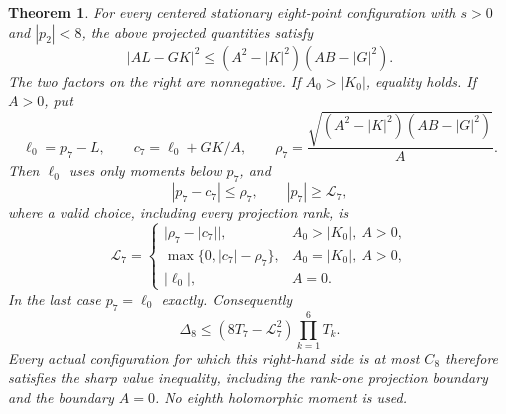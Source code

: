 \documentclass[11pt]{article}
\newtheorem{theorem}{Theorem}[section]
\theoremstyle{remark}
\numberwithin{equation}{section}
\begin{document}
\begin{theorem}\label{thm:noorigin-oct8-eight-all-rank-certificate}
For every centered stationary eight-point configuration with
$s>0$ and $|p_2|<8$, the above projected quantities satisfy
\begin{equation}\label{eq:noorigin-oct8-eight-disk}
 |AL-GK|^2\le(A^2-|K|^2)(AB-|G|^2).
\end{equation}
The two factors on the right are nonnegative. If
$A_0>|K_0|$, equality holds. If $A>0$, put
\[
 \ell_0=p_7-L,\qquad c_7=\ell_0+GK/A,
 \qquad
 \rho_7=\frac{\sqrt{(A^2-|K|^2)(AB-|G|^2)}}{A}.
\]
Then $\ell_0$ uses only moments below $p_7$, and
\[
 |p_7-c_7|\le\rho_7,
 \qquad |p_7|\ge\mathcal L_7,
\]
where a valid choice, including every projection rank, is
\[
 \mathcal L_7=
 \begin{cases}
 \bigl|\rho_7-|c_7|\bigr|,&A_0>|K_0|,\ A>0,\\
 \max\{0,|c_7|-\rho_7\},&A_0=|K_0|,\ A>0,\\
 |\ell_0|,&A=0.
 \end{cases}
\]
In the last case $p_7=\ell_0$ exactly. Consequently
\begin{equation}\label{eq:noorigin-oct8-eight-all-rank-value}
 \Delta_8\le(8T_7-\mathcal L_7^2)\prod_{k=1}^6T_k.
\end{equation}
Every actual configuration for which this right-hand side is at
most $C_8$ therefore satisfies the sharp value inequality, including
the rank-one projection boundary and the boundary $A=0$.
No eighth holomorphic moment is used.
\end{theorem}
\end{document}
